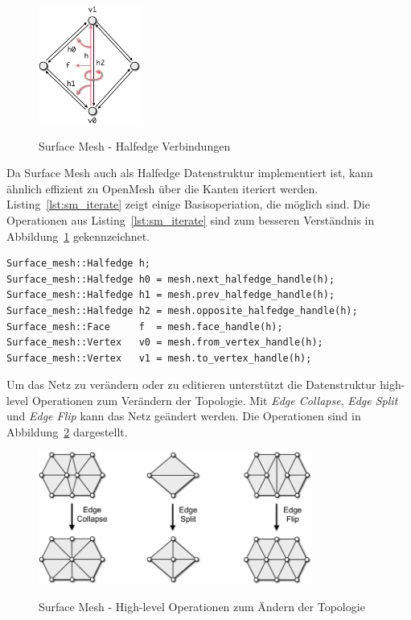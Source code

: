 \begin{figure}[h]
  \caption{Surface Mesh - Halfedge Verbindungen}
  \centering
  \includegraphics[width=0.3\textwidth]{content/media/sm_connectivity-queries}
  \label{fig:sm_halfedge}
\end{figure}

Da Surface Mesh auch als Halfedge Datenstruktur implementiert ist, kann ähnlich effizient zu OpenMesh über die Kanten iteriert werden.
Listing~\ref{lst:sm_iterate} zeigt einige Basisoperiation, die möglich sind.
Die Operationen aus Listing~\ref{lst:sm_iterate} sind zum besseren Verständnis in Abbildung~\ref{fig:sm_halfedge} gekennzeichnet. \cite{OpenGP.24.07.2015}

\begin{lstlisting}[style=myCppStyle, caption=Surface Mesh - Iterieren über Kanten einer Fläche, label=lst:sm_iterate]
Surface_mesh::Halfedge h;
Surface_mesh::Halfedge h0 = mesh.next_halfedge_handle(h);
Surface_mesh::Halfedge h1 = mesh.prev_halfedge_handle(h);
Surface_mesh::Halfedge h2 = mesh.opposite_halfedge_handle(h);
Surface_mesh::Face     f  = mesh.face_handle(h);
Surface_mesh::Vertex   v0 = mesh.from_vertex_handle(h);
Surface_mesh::Vertex   v1 = mesh.to_vertex_handle(h);
\end{lstlisting}

Um das Netz zu verändern oder zu editieren unterstützt die Datenstruktur high-level Operationen zum Verändern der Topologie.
Mit \emph{Edge Collapse}, \emph{Edge Split} und \emph{Edge Flip} kann das Netz geändert werden.
Die Operationen sind in Abbildung~\ref{fig:sm_topology} dargestellt. \cite{OpenGP.24.07.2015}

\begin{figure}[h]
  \caption{Surface Mesh - High-level Operationen zum Ändern der Topologie}
  \centering
  \includegraphics[width=0.8\textwidth]{content/media/sm_topology-changes}
  \label{fig:sm_topology}
\end{figure}

